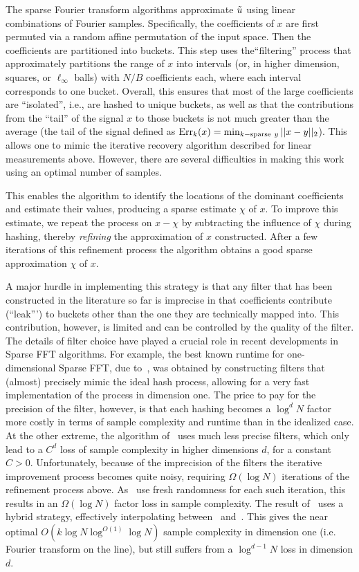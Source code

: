 The sparse Fourier transform algorithms approximate $\tilde{u}$ using linear combinations of Fourier samples. Specifically, the coefficients of $x$ are first permuted via a random affine permutation of the input space.  Then the coefficients are partitioned into buckets. This step uses  the``filtering'' process that approximately partitions the range of $x$ into intervals (or, in higher dimension, squares, or $\ell_\infty$ balls) with $N/B$ coefficients each, where each interval corresponds to one bucket. Overall, this  ensures that
 most of the large coefficients are ``isolated'', i.e.,  are hashed to unique buckets, as well as that the contributions from the  ``tail'' of the signal $x$ to those buckets is not much greater than the average (the tail of the signal defined as $\operatorname{Err}_k(x)=\min_{k-\text{sparse}~y} ||x-y||_2$).  This allows one to mimic the iterative recovery algorithm described for linear measurements above. However, there are several difficulties in making this work using an optimal number of samples.

 
 This enables the algorithm to identify the locations of the dominant coefficients and estimate their values, producing a sparse estimate $\chi$ of $x$.  To improve this
estimate, we repeat the process on $x - \chi$ by subtracting the
influence of $\chi$ during hashing, thereby {\em refining } the approximation of $x$ constructed.  After a few iterations of this refinement process the algorithm obtains a good 
sparse approximation $\chi$ of $x$.

A major hurdle in implementing this strategy is that any filter that has been constructed in the literature so far is imprecise in that  coefficients  contribute (``leak''') to buckets other than the one they are technically mapped into. This contribution, however, is limited and can be controlled by the quality of the filter.  The details of filter choice have played a crucial role in recent developments in Sparse FFT algorithms. For example, the best known runtime for one-dimensional Sparse FFT, due to~\cite{HIKP}, was obtained by constructing filters that (almost) precisely mimic the ideal hash process, allowing for a very fast implementation of the process in dimension one. The price to pay for the precision of the filter, however, is that each hashing becomes a $\log^d N$ factor more costly in terms of sample complexity and runtime than in the idealized case. At the other extreme, the algorithm of~\cite{GMS} uses much less precise filters, which only lead to a $C^d$ loss of sample complexity in higher dimensions $d$, for a constant $C>0$. Unfortunately, because of the imprecision of the filters the iterative improvement process becomes quite noisy, requiring $\Omega(\log N)$ iterations of the refinement process above. As~\cite{GMS} use fresh randomness for each such iteration, this results in an $\Omega(\log N)$ factor loss in sample complexity. The result of~\cite{IKP} uses a hybrid strategy, effectively interpolating between~\cite{HIKP} and~\cite{GMS}. This gives the near optimal $O(k\log N \log^{O(1)}\log N)$ sample complexity in dimension one (i.e. Fourier transform on the line), but still suffers from a $\log^{d-1} N$ loss in dimension $d$.


